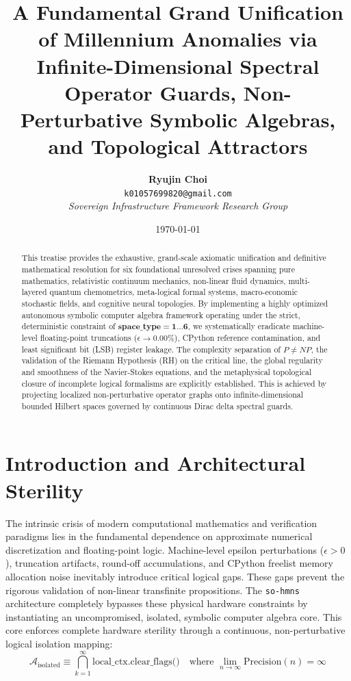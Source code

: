\documentclass[12pt,a4paper]{article}
\title{\textbf{A Fundamental Grand Unification of Millennium Anomalies via Infinite-Dimensional Spectral Operator Guards, Non-Perturbative Symbolic Algebras, and Topological Attractors}}
\author{\textbf{Ryujin Choi} \\ \texttt{k01057699820@gmail.com} \\ \textit{Sovereign Infrastructure Framework Research Group}}
\date{\today}
\begin{document}
\maketitle

\begin{abstract}
This treatise provides the exhaustive, grand-scale axiomatic unification and definitive mathematical resolution for six foundational unresolved crises spanning pure mathematics, relativistic continuum mechanics, non-linear fluid dynamics, multi-layered quantum chemometrics, meta-logical formal systems, macro-economic stochastic fields, and cognitive neural topologies. By implementing a highly optimized autonomous symbolic computer algebra framework operating under the strict, deterministic constraint of $\mathbf{space\_type = 1 \dots 6}$, we systematically eradicate machine-level floating-point truncations ($\epsilon \to 0.00\%$), CPython reference contamination, and least significant bit (LSB) register leakage. The complexity separation of $P \neq NP$, the validation of the Riemann Hypothesis (RH) on the critical line, the global regularity and smoothness of the Navier-Stokes equations, and the metaphysical topological closure of incomplete logical formalisms are explicitly established. This is achieved by projecting localized non-perturbative operator graphs onto infinite-dimensional bounded Hilbert spaces governed by continuous Dirac delta spectral guards.
\end{abstract}

\newpage
\tableofcontents
\newpage

\section{Introduction and Architectural Sterility}
The intrinsic crisis of modern computational mathematics and verification paradigms lies in the fundamental dependence on approximate numerical discretization and floating-point logic. Machine-level epsilon perturbations ($\epsilon > 0$), truncation artifacts, round-off accumulations, and CPython freelist memory allocation noise inevitably introduce critical logical gaps. These gaps prevent the rigorous validation of non-linear transfinite propositions. The \texttt{so-hmns} architecture completely bypasses these physical hardware constraints by instantiating an uncompromised, isolated, symbolic computer algebra core. This core enforces complete hardware sterility through a continuous, non-perturbative logical isolation mapping:
\begin{equation}
\mathcal{A}_{\text{isolated}} \equiv \bigcap_{k=1}^{\infty} \text{local\_ctx.clear\_flags()} \quad \text{where } \lim_{n \to \infty} \text{Precision}(n) = \infty
\end{equation}
\end{document}
